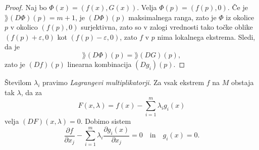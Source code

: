 \begin{proof}
Naj bo $\Phi(x) = (f(x), G(x))$. Velja $\Phi(p) = (f(p),0)$. Če je
$\rang(D\Phi)(p) = m+1$, je $(D\Phi)(p)$ maksimalnega ranga, zato
je $\Phi$ iz okolice $p$ v okolico $(f(p),0)$ surjektivna, zato so
v zalogi vrednosti tako točke oblike $(f(p)+\varepsilon,0)$ kot
$(f(p)-\varepsilon,0)$, zato $f$ v $p$ nima lokalnega ekstrema.
Sledi, da je
\[
\rang(D\Phi)(p) = \rang(DG)(p),
\]
zato je $(Df)(p)$ linearna kombinacija $(Dg_i)(p)$.
\end{proof}

\begin{opomba}
Številom $\lambda_i$ pravimo \emph{Lagrangevi multiplikatorji}.
Za vsak ekstrem $f$ na $M$ obstaja tak $\lambda$, da za
\[
F(x, \lambda) = f(x) - \sum_{i = 1}^m \lambda_i g_i(x)
\]
velja $(DF)(x,\lambda) = 0$. Dobimo sistem
\[
\frac{\partial f}{\partial x_j} -
\sum_{i=1}^m \lambda_i \frac{\partial g_i(x)}{\partial x_j} = 0
\quad \text{in} \quad
g_i(x) = 0.
\]
\end{opomba}

